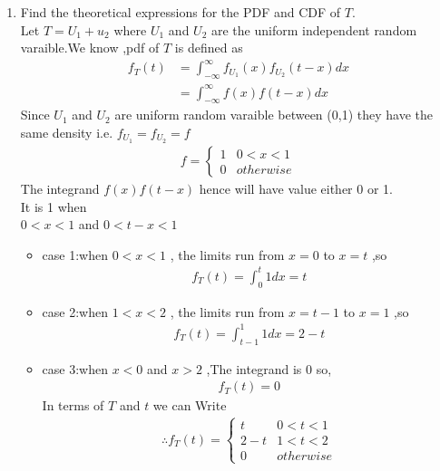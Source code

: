 \documentclass[journal,12pt,twocolumn]{IEEEtran}
\renewcommand\thesection{\arabic{section}}
\begin{document}
\begin{enumerate}[label=\thesection.\arabic*
,ref=\thesection.\theenumi]
\begin{figure}[h]
    \centering
    \texttt{[image: T\_Pdf.png]}
    \caption{The PDF of $T$}
    \label{fig:T_Pdf}
\end{figure}
\item Find the theoretical expressions for the PDF and CDF of $T$.\\
\solution Let $T = U_1 + u_2$ where $U_1$ and $U_2$ are the uniform independent random varaible.We know ,pdf of $T$ is defined as 
\begin{align}
    f_T(t) &= \int_{-\infty}^{\infty}f_{U_1}(x)f_{U_2}(t-x)dx\\
    &=\int_{-\infty}^{\infty}f(x)f(t-x)dx
\end{align}
Since $U_1$ and $U_2$ are uniform random varaible between (0,1) they have the same density
i.e. $f_{U_1} = f_{U_2} = f$
\begin{align}
    f = \begin{cases}
        1 & 0<x<1 \\
        0 & otherwise
    \end{cases}
\end{align}
The integrand $f(x)f(t-x)$ hence will have value either 0 or 1. \\
It is 1 when \\
$0<x<1$ and $0<t-x<1$ 
\begin{itemize}
    \item case 1:when $0<x<1$ , the limits run from $x=0$ to $x=t$ ,so
    \begin{align}
        f_T(t)=\int_0^t 1dx = t
    \end{align}
    \item case 2:when $1<x<2$ , the limits run from $x=t-1$ to $x=1$ ,so
    \begin{align}
        f_T(t)=\int_{t-1}^1 1dx = 2-t
    \end{align}
    \item case 3:when $x<0$ and $x>2$ ,The integrand is 0 so, 
    \begin{align}
        f_T(t)=0
    \end{align}
In terms of $T$ and $t$ we can Write
\begin{align}\label{pdf}
    \therefore f_T(t)=\begin{cases}
        t &0<t<1 \\
        2-t &1<t<2 \\
        0 &otherwise
    \end{cases}
\end{align}

\end{itemize}
\end{enumerate}
\end{document}
